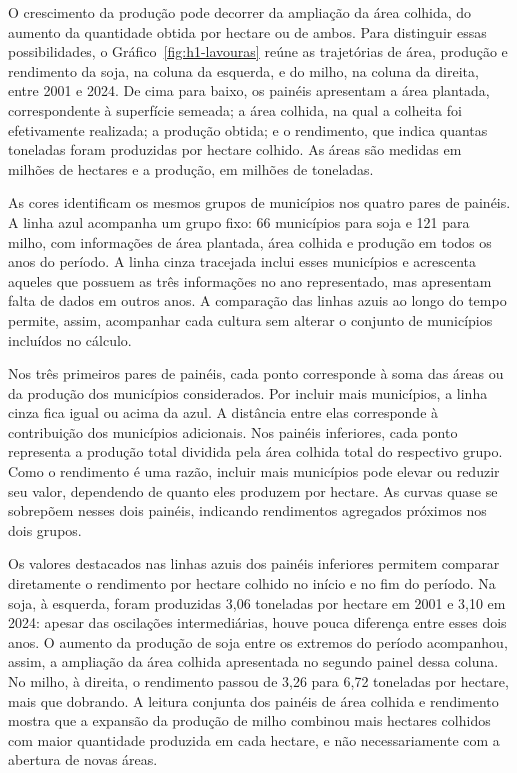 O crescimento da produção pode decorrer da ampliação da área colhida, do aumento da quantidade obtida por hectare ou de ambos. Para distinguir essas possibilidades, o Gráfico~\ref{fig:h1-lavouras} reúne as trajetórias de área, produção e rendimento da soja, na coluna da esquerda, e do milho, na coluna da direita, entre 2001 e 2024. De cima para baixo, os painéis apresentam a área plantada, correspondente à superfície semeada; a área colhida, na qual a colheita foi efetivamente realizada; a produção obtida; e o rendimento, que indica quantas toneladas foram produzidas por hectare colhido. As áreas são medidas em milhões de hectares e a produção, em milhões de toneladas.

As cores identificam os mesmos grupos de municípios nos quatro pares de painéis. A linha azul acompanha um grupo fixo: 66 municípios para soja e 121 para milho, com informações de área plantada, área colhida e produção em todos os anos do período. A linha cinza tracejada inclui esses municípios e acrescenta aqueles que possuem as três informações no ano representado, mas apresentam falta de dados em outros anos. A comparação das linhas azuis ao longo do tempo permite, assim, acompanhar cada cultura sem alterar o conjunto de municípios incluídos no cálculo.

Nos três primeiros pares de painéis, cada ponto corresponde à soma das áreas ou da produção dos municípios considerados. Por incluir mais municípios, a linha cinza fica igual ou acima da azul. A distância entre elas corresponde à contribuição dos municípios adicionais. Nos painéis inferiores, cada ponto representa a produção total dividida pela área colhida total do respectivo grupo. Como o rendimento é uma razão, incluir mais municípios pode elevar ou reduzir seu valor, dependendo de quanto eles produzem por hectare. As curvas quase se sobrepõem nesses dois painéis, indicando rendimentos agregados próximos nos dois grupos.

Os valores destacados nas linhas azuis dos painéis inferiores permitem comparar diretamente o rendimento por hectare colhido no início e no fim do período. Na soja, à esquerda, foram produzidas 3,06 toneladas por hectare em 2001 e 3,10 em 2024: apesar das oscilações intermediárias, houve pouca diferença entre esses dois anos. O aumento da produção de soja entre os extremos do período acompanhou, assim, a ampliação da área colhida apresentada no segundo painel dessa coluna. No milho, à direita, o rendimento passou de 3,26 para 6,72 toneladas por hectare, mais que dobrando. A leitura conjunta dos painéis de área colhida e rendimento mostra que a expansão da produção de milho combinou mais hectares colhidos com maior quantidade produzida em cada hectare, e não necessariamente com a abertura de novas áreas.


